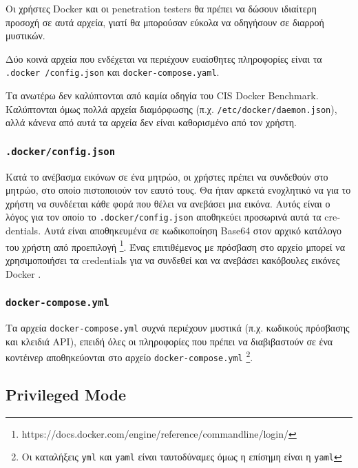 Οι χρήστες \textlatin{Docker} και οι \textlatin{penetration testers} θα πρέπει
να δώσουν ιδιαίτερη προσοχή σε αυτά αρχεία, γιατί θα μπορούσαν εύκολα να
οδηγήσουν σε διαρροή μυστικών.

Δύο κοινά αρχεία που ενδέχεται να περιέχουν ευαίσθητες πληροφορίες είναι τα 
\texttt{\textlatin{.docker
/config.json}} και \texttt{\textlatin{docker-compose.yaml}}.

Τα ανωτέρω δεν καλύπτονται από καμία οδηγία του \textlatin{CIS Docker Benchmark}.
Καλύπτονται όμως πολλά αρχεία διαμόρφωσης (π.χ.
\texttt{\textlatin{/etc/docker/daemon.json}}), αλλά κάνενα από αυτά τα αρχεία
δεν είναι καθορισμένο από τον χρήστη.

\subsubsection{\texttt{\textlatin{.docker/config.json}}}

Κατά το ανέβασμα εικόνων σε ένα μητρώο, οι χρήστες πρέπει να συνδεθούν στο
μητρώο, στο οποίο πιστοποιούν τον εαυτό τους. Θα ήταν αρκετά ενοχλητικό να
για το χρήστη να συνδέεται κάθε φορά που θέλει να ανεβάσει μια εικόνα. Αυτός
είναι ο λόγος για τον οποίο το \texttt{\textlatin{.docker/config.json}}
αποθηκεύει προσωρινά αυτά τα \textlatin{credentials}. Αυτά είναι αποθηκευμένα
σε κωδικοποίηση \textlatin{Base64} στον αρχικό κατάλογο του χρήστη από
προεπιλογή
\footnote{\textlatin{https://docs.docker.com/engine/reference/commandline/login/}}.
Ένας επιτιθέμενος με πρόσβαση στο αρχείο μπορεί να χρησιμοποιήσει τα
\textlatin{credentials} για να συνδεθεί και να ανεβάσει κακόβουλες εικόνες
\textlatin{Docker} \cite{Docker-Credentials-Metasploit}.

\subsubsection{\texttt{\textlatin{docker-compose.yml}}}

Τα αρχεία \texttt{\textlatin{docker-compose.yml}} συχνά περιέχουν μυστικά (π.χ.
κωδικούς πρόσβασης και κλειδιά \textlatin{API}), επειδή όλες οι πληροφορίες που
πρέπει να διαβιβαστούν σε ένα κοντέινερ αποθηκεύονται στο
αρχείο \texttt{\textlatin{docker-compose.yml}} \footnote{Οι καταλήξεις
\texttt{\textlatin{yml}} και \texttt{\textlatin{yaml}} είναι ταυτοδύναμες όμως
η επίσημη είναι η \texttt{\textlatin{yaml}}}.

\subsection{\textlatin{Privileged Mode}}

